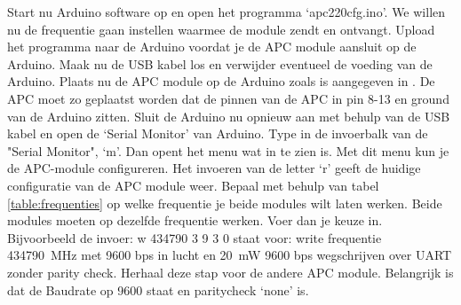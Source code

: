 Start nu Arduino software op en open het programma `apc220cfg.ino'. We
willen nu de frequentie gaan instellen waarmee de module zendt en
ontvangt. Upload het programma naar de Arduino voordat je de APC module
aansluit op de Arduino. Maak nu de USB kabel los en verwijder eventueel
de voeding van de Arduino. Plaats nu de APC module op de Arduino zoals
is aangegeven in . De APC moet zo
geplaatst worden dat de pinnen van de APC in pin 8-13 en ground van de
Arduino zitten. Sluit de Arduino nu opnieuw aan met behulp van de USB
kabel en open de `Serial Monitor' van Arduino. Type in de invoerbalk van
de "Serial Monitor", `m'. Dan opent het menu wat in
 te zien is. Met dit menu kun je de APC-module
configureren. Het invoeren van de letter `r' geeft de huidige
configuratie van de APC module weer. Bepaal met behulp van tabel
\ref{table:frequenties} op welke frequentie je beide modules wilt laten
werken. Beide modules moeten op dezelfde frequentie werken. Voer dan je
keuze in. Bijvoorbeeld de invoer: w 434790 3 9 3 0 staat voor: write
frequentie \SI{434790}{\MHz} met 9600 bps in lucht en
\SI{20}{\milli\watt} 9600 bps wegschrijven over UART zonder parity check.
Herhaal deze stap voor de andere APC module. Belangrijk is dat de Baudrate op 
9600 staat en paritycheck `none' is.

